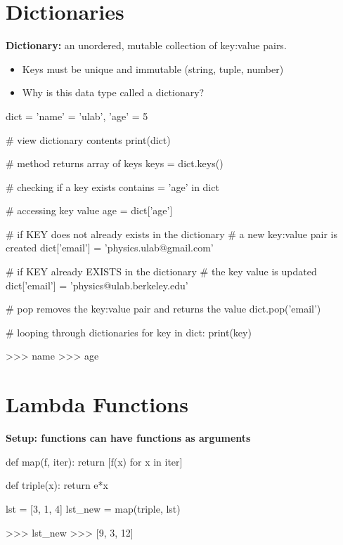 \documentclass[12pt]{article}
\numberwithin{equation}{section}
\begin{document}
\section{Dictionaries}
\textbf{Dictionary: }an unordered, mutable collection of key:value pairs. 
\begin{itemize}
    \item Keys must be unique and immutable (string, tuple, number)
    \item Why is this data type called a dictionary?
\end{itemize}
\begin{python}
dict = {
    'name' = 'ulab',
    'age' = 5
}
\end{python}
\begin{python}
# view dictionary contents
print(dict)

# method returns array of keys
keys = dict.keys()

# checking if a key exists
contains = 'age' in dict

# accessing key value
age = dict['age']

# if KEY does not already exists in the dictionary
# a new key:value pair is created
dict['email'] = 'physics.ulab@gmail.com'

# if KEY already EXISTS in the dictionary
# the key value is updated
dict['email'] = 'physics@ulab.berkeley.edu'

# pop removes the key:value pair and returns the value
dict.pop('email')

# looping through dictionaries
for key in dict:
    print(key)
    
>>> name
>>> age
\end{python}

\section{Lambda Functions}

\textbf{Setup: functions can have functions as arguments}
\begin{python}
def map(f, iter):
    return [f(x) for x in iter]
    
def triple(x):
    return e*x

lst = [3, 1, 4]
lst_new = map(triple, lst)

>>> lst_new
>>> [9, 3, 12]
\end{python}
\end{document}
